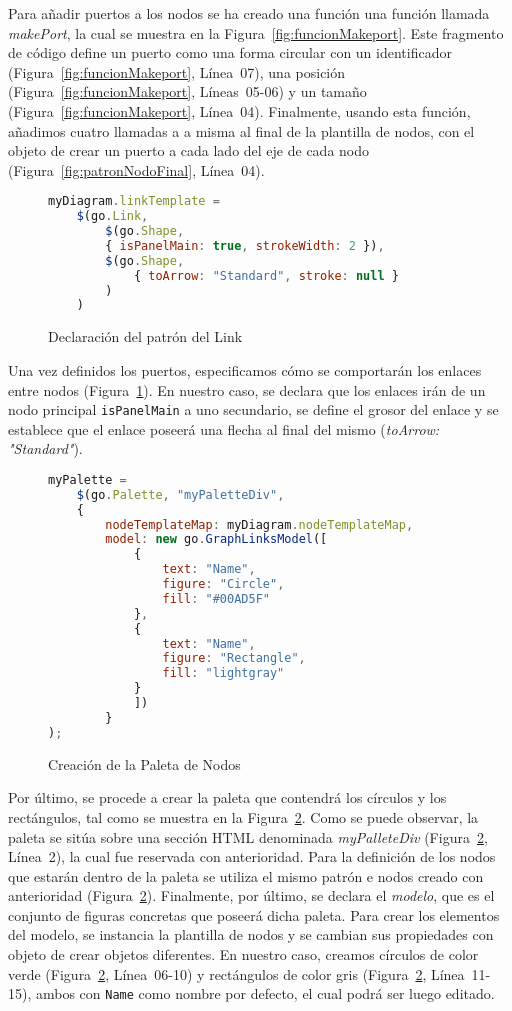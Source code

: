 Para añadir puertos a los nodos se ha creado una función una función llamada \emph{makePort}, la cual se muestra en la Figura~\ref{fig:funcionMakeport}. Este fragmento de código define un puerto como una forma circular con un identificador (Figura~\ref{fig:funcionMakeport}, Línea~07), una posición (Figura~\ref{fig:funcionMakeport}, Líneas~05-06) y un tamaño (Figura~\ref{fig:funcionMakeport}, Línea~04). Finalmente, usando esta función, añadimos cuatro llamadas a a misma al final de la plantilla de nodos, con el objeto de crear un puerto a cada lado del eje de cada nodo (Figura~\ref{fig:patronNodoFinal}, Línea~04).

\begin{figure}[H]
	\centering
	\begin{lstlisting}[language=JavaScript]
	myDiagram.linkTemplate =
	$(go.Link,
		$(go.Shape,
		{ isPanelMain: true, strokeWidth: 2 }),
		$(go.Shape,
			{ toArrow: "Standard", stroke: null }
		)
	)\end{lstlisting}
	\caption{Declaración del patrón del Link}
	\label{fig:patronlink}
\end{figure}

Una vez definidos los puertos, especificamos cómo se comportarán los enlaces entre nodos (Figura~\ref{fig:patronlink}). En nuestro caso, se declara que los enlaces irán de un nodo principal \texttt{isPanelMain} a uno secundario,  se define el grosor del enlace y se establece que el enlace poseerá una flecha al final del mismo (\emph{toArrow: "Standard"}).




\begin{figure}[H]
	\centering
\begin{lstlisting}[language=JavaScript]
myPalette =
	$(go.Palette, "myPaletteDiv",
	{
		nodeTemplateMap: myDiagram.nodeTemplateMap,
		model: new go.GraphLinksModel([
			{ 
				text: "Name", 
				figure: "Circle", 
				fill: "#00AD5F" 
			},
			{ 
				text: "Name", 
				figure: "Rectangle", 
				fill: "lightgray" 
			}
			])
		}
);\end{lstlisting}
\caption{Creación de la Paleta de Nodos}
\label{fig:paletaNodos}
\end{figure}

Por último, se procede a crear la paleta que contendrá los círculos y los rectángulos, tal como se muestra en la Figura~\ref{fig:paletaNodos}. Como se puede observar, la paleta se sitúa sobre una sección HTML denominada \emph{myPalleteDiv} (Figura~\ref{fig:paletaNodos}, Línea~2), la cual fue reservada con anterioridad. Para la definición de los nodos que estarán dentro de la paleta se utiliza el mismo patrón e nodos creado con anterioridad (Figura~\ref{fig:paletaNodos}). Finalmente, por último, se declara el \emph{modelo}, que es el conjunto de figuras concretas que poseerá dicha paleta. Para crear los elementos del modelo, se instancia la plantilla de nodos y se cambian sus propiedades con objeto de crear objetos diferentes. En nuestro caso, creamos círculos de color verde (Figura~\ref{fig:paletaNodos}, Línea~06-10) y rectángulos de color gris (Figura~\ref{fig:paletaNodos}, Línea~11-15), ambos con \texttt{Name} como nombre por defecto, el cual podrá ser luego editado.

